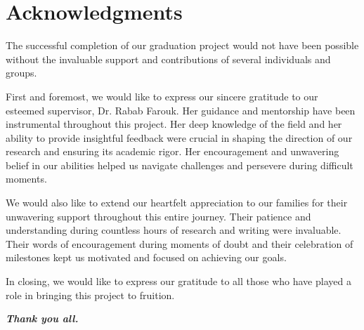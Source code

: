 \chapter*{Acknowledgments}

The successful completion of our graduation project would not have been possible without the invaluable support and contributions of several individuals and groups.

First and foremost, we would like to express our sincere gratitude to our esteemed supervisor, Dr. Rabab Farouk. Her guidance and mentorship have been instrumental throughout this project. Her deep knowledge of the field and her ability to provide insightful feedback were crucial in shaping the direction of our research and ensuring its academic rigor. Her encouragement and unwavering belief in our abilities helped us navigate challenges and persevere during difficult moments.

We would also like to extend our heartfelt appreciation to our families for their unwavering support throughout this entire journey. Their patience and understanding during countless hours of research and writing were invaluable. Their words of encouragement during moments of doubt and their celebration of milestones kept us motivated and focused on achieving our goals.

In closing, we would like to express our gratitude to all those who have played a role in bringing this project to fruition.

\vspace{1cm}
\begin{center}
\textit{\textbf{Thank you all.}}
\end{center}
